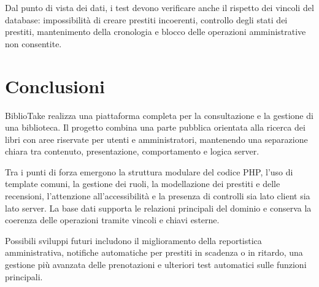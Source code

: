 ﻿\documentclass{article}
\newcommand{\nomeprogetto}{BiblioTake}
\begin{document}
Dal punto di vista dei dati, i test devono verificare anche il rispetto dei vincoli del database: impossibilità di creare prestiti incoerenti, controllo degli stati dei prestiti, mantenimento della cronologia e blocco delle operazioni amministrative non consentite.

\newpage

\section{Conclusioni}
\nomeprogetto{} realizza una piattaforma completa per la consultazione e la gestione di una biblioteca. Il progetto combina una parte pubblica orientata alla ricerca dei libri con aree riservate per utenti e amministratori, mantenendo una separazione chiara tra contenuto, presentazione, comportamento e logica server.

Tra i punti di forza emergono la struttura modulare del codice PHP, l'uso di template comuni, la gestione dei ruoli, la modellazione dei prestiti e delle recensioni, l'attenzione all'accessibilità e la presenza di controlli sia lato client sia lato server. La base dati supporta le relazioni principali del dominio e conserva la coerenza delle operazioni tramite vincoli e chiavi esterne.

Possibili sviluppi futuri includono il miglioramento della reportistica amministrativa, notifiche automatiche per prestiti in scadenza o in ritardo, una gestione più avanzata delle prenotazioni e ulteriori test automatici sulle funzioni principali.
\end{document}
